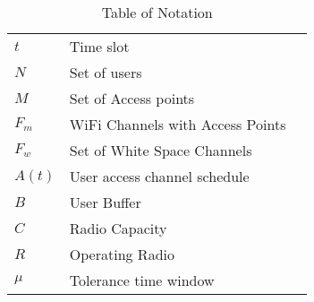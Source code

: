 \begin{table}[htbp]
\begin{center}%
\begin{tabular}{l l p{10cm} }
\toprule
$t$ & Time slot\\
$N$ & Set of users\\
$M$ & Set of Access points\\
$F_{m}$ & WiFi Channels with Access Points\\
$F_{w}$ & Set of White Space Channels\\
$A(t)$ & User access channel schedule\\
$B$ & User Buffer\\
$C$ & Radio Capacity\\
$R$ & Operating Radio\\
$\mu$ & Tolerance time window \\
\bottomrule
\end{tabular}
\end{center}
\caption{Table of Notation}
\label{tab:notation}
\end{table}
